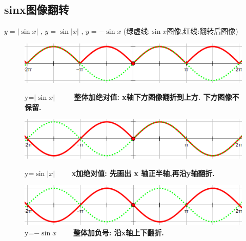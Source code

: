 \documentclass[hyperref, UTF8,11pt,a4paper]{ctexart} %
\begin{document}
\subsection {sinx图像翻转}
$y=|\sin x|$ , $y=\sin |x|$ , $y=-\sin x$  \qquad (绿虚线:$\sin x$图像,红线:翻转后图像) \\
\begin{figure}[htbp]
	\begin{center}
		\includegraphics[scale=0.6]  {pic/sanjiaohanshu/abs(sin(x)).png}
		\caption{y=$|\sin x|$ $\qquad$ \textbf{整体加绝对值: x轴下方图像翻折到上方. 下方图像不保留.}  }
		\includegraphics[scale=0.6]  {pic/sanjiaohanshu/sin(abs(x)).png}
		\caption{y=$\sin |x|$ $\qquad$\textbf{x加绝对值: 先画出 x 轴正半轴,再沿y轴翻折.}}
		\includegraphics[scale=0.6]  {pic/sanjiaohanshu/-sinx.png}
		\caption{y=$-\sin x$ $\qquad$\textbf{整体加负号: 沿x轴上下翻折.}}
	\end{center}

\end{figure}

\end{document}
